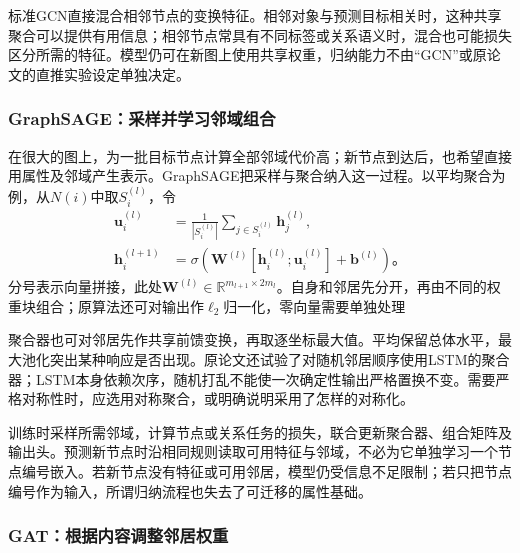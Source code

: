 标准GCN直接混合相邻节点的变换特征。相邻对象与预测目标相关时，这种共享聚合可以提供有用信息；相邻节点常具有不同标签或关系语义时，混合也可能损失区分所需的特征。模型仍可在新图上使用共享权重，归纳能力不由“GCN”或原论文的直推实验设定单独决定。

\subsubsection{GraphSAGE：采样并学习邻域组合}
\label{sec:gnn-graphsage}

在很大的图上，为一批目标节点计算全部邻域代价高；新节点到达后，也希望直接用属性及邻域产生表示。GraphSAGE把采样与聚合纳入这一过程。以平均聚合为例，从$N(i)$中取$S_i^{(l)}$，令
\begin{equation}
  \begin{aligned}
    \bm{u}_i^{(l)}&=\frac{1}{|S_i^{(l)}|}\sum_{j\in S_i^{(l)}}\bm{h}_j^{(l)},\\
    \bm{h}_i^{(l+1)}&=\sigma\!\left(
      \bm{W}^{(l)}[\bm{h}_i^{(l)};\bm{u}_i^{(l)}]+\bm{b}^{(l)}\right)\text{。}
  \end{aligned}
  \label{eq:gnn-graphsage}
\end{equation}
分号表示向量拼接，此处$\bm{W}^{(l)}\in\mathbb{R}^{m_{l+1}\times2m_l}$。自身和邻居先分开，再由不同的权重块组合；原算法还可对输出作$\ell_2$归一化，零向量需要单独处理

聚合器也可对邻居先作共享前馈变换，再取逐坐标最大值。平均保留总体水平，最大池化突出某种响应是否出现。原论文还试验了对随机邻居顺序使用LSTM的聚合器；LSTM本身依赖次序，随机打乱不能使一次确定性输出严格置换不变。需要严格对称性时，应选用对称聚合，或明确说明采用了怎样的对称化。

训练时采样所需邻域，计算节点或关系任务的损失，联合更新聚合器、组合矩阵及输出头。预测新节点时沿相同规则读取可用特征与邻域，不必为它单独学习一个节点编号嵌入。若新节点没有特征或可用邻居，模型仍受信息不足限制；若只把节点编号作为输入，所谓归纳流程也失去了可迁移的属性基础。

\subsubsection{GAT：根据内容调整邻居权重}
\label{sec:gnn-gat}

